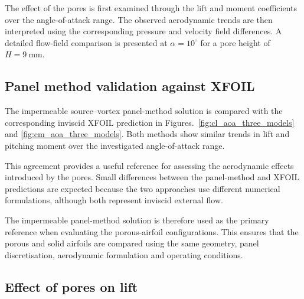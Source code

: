 \documentclass[a4paper,fleqn]{cas-dc}
\begin{document}
	The effect of the pores is first examined through the lift and
	moment coefficients over the angle-of-attack range. The observed aerodynamic trends are then
	interpreted using the corresponding pressure and velocity field
	differences. A detailed flow-field comparison is presented at
	$\alpha=10^\circ$ for a pore height of $H=9~\mathrm{mm}$.
	
	
	
	\subsection{Panel method validation against XFOIL}
	\label{subsec:Panel_method_validation_against_XFOIL}
	
	The impermeable source--vortex panel-method solution is compared with
	the corresponding inviscid XFOIL prediction in
	Figures.~\ref{fig:cl_aoa_three_models} and
	\ref{fig:cm_aoa_three_models}. Both methods show similar trends in lift
	and pitching moment over the investigated angle-of-attack range.
	
	This agreement provides a useful reference for assessing the aerodynamic
	effects introduced by the pores. Small differences between the
	panel-method and XFOIL predictions are expected because the two
	approaches use different numerical formulations, although both represent
	inviscid external flow.
	
	The impermeable panel-method solution is therefore used as the primary
	reference when evaluating the porous-airfoil configurations. This
	ensures that the porous and solid airfoils are compared using the same
	geometry, panel discretisation, aerodynamic formulation and operating
	conditions.
	
	
	\subsection{Effect of pores on lift}
	\label{subsec:lift_results}
	
\end{document}
